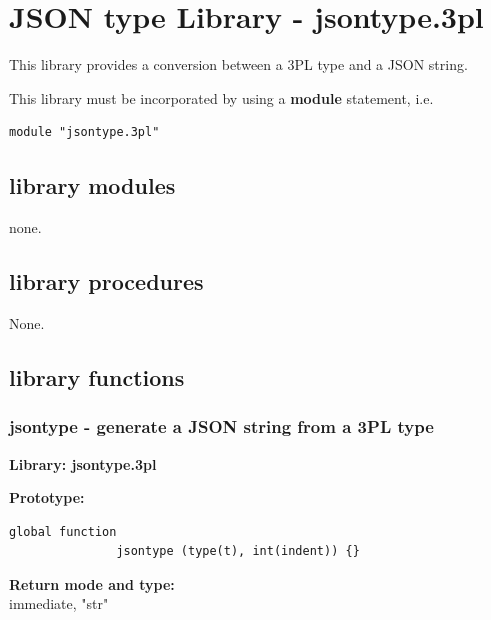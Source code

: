 \pagebreak

\section{JSON type Library - jsontype.3pl}\label{chap:jsont}

    This library provides a conversion between a 3PL type and a JSON string.
    
    This library must be incorporated by using a {\bf module} statement, i.e.
    \begin{lstlisting}[gobble=4, language=threepl]
       module "jsontype.3pl"
    \end{lstlisting}



    \subsection{library modules}


        none.


    \subsection{library procedures}
    
        None.




    \subsection{library functions}
    


        \subsubsection{jsontype - generate a JSON string from a 3PL type}\label{sec:lfjsontype}

            {\bf Library: jsontype.3pl}

            {\bf Prototype:} \\
            \vsp
            \begin{lstlisting}[gobble=12, language=threepl]
               global function
               jsontype (type(t), int(indent)) {}
            \end{lstlisting}

            {\bf Return mode and type:} \\
            immediate, "str"

